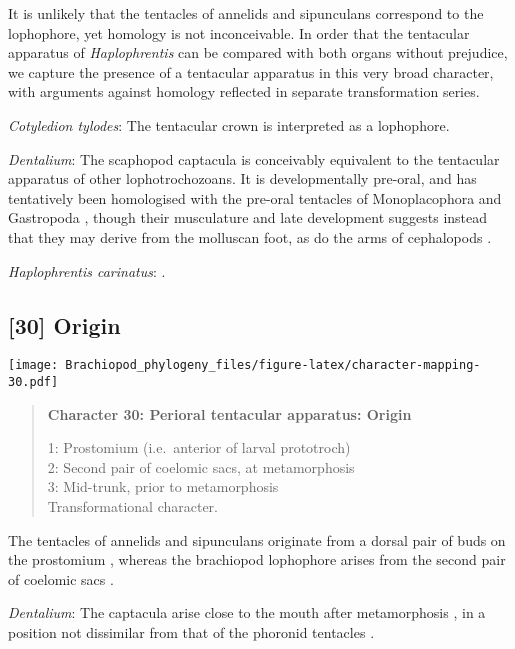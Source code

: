 \documentclass[openany]{book}
\theoremstyle{definition}
\theoremstyle{definition}
\theoremstyle{definition}
\theoremstyle{remark}
\begin{document}
It is unlikely that the tentacles of annelids and sipunculans correspond
to the lophophore, yet homology is not inconceivable. In order that the
tentacular apparatus of \emph{Haplophrentis} can be compared with both
organs without prejudice, we capture the presence of a tentacular
apparatus in this very broad character, with arguments against homology
reflected in separate transformation series.

\hypertarget{Cotyledion_tylodes-coding-29}{}
\emph{Cotyledion tylodes}: The tentacular crown \citep{Zhang2013} is
interpreted as a lophophore.

\hypertarget{Dentalium-coding-29}{}
\emph{Dentalium}: The scaphopod captacula is conceivably equivalent to
the tentacular apparatus of other lophotrochozoans. It is
developmentally pre-oral, and has tentatively been homologised with the
pre-oral tentacles of Monoplacophora and Gastropoda \citep{Steiner1992},
though their musculature and late development suggests instead that they
may derive from the molluscan foot, as do the arms of cephalopods
\citep{Wanninger2002M}.

\hypertarget{Haplophrentis_carinatus-coding-29}{}
\emph{Haplophrentis carinatus}: \citet{Moysiuk2017Hyolithsare}.

\subsection*{{[}30{]} Origin}\label{origin}

\texttt{[image: Brachiopod\_phylogeny\_files/figure-latex/character-mapping-30.pdf]}

\begin{quote}
\textbf{Character 30: Perioral tentacular apparatus: Origin}

1: Prostomium (i.e.~anterior of larval prototroch)\\
2: Second pair of coelomic sacs, at metamorphosis\\
3: Mid-trunk, prior to metamorphosis\\
Transformational character.
\end{quote}

The tentacles of annelids and sipunculans originate from a dorsal pair
of buds on the prostomium \citep{Adrianov2006}, whereas the brachiopod
lophophore arises from the second pair of coelomic sacs
\citep{Nielsen1991}.

\hypertarget{Dentalium-coding-30}{}
\emph{Dentalium}: The captacula arise close to the mouth after
metamorphosis \citep{Wanninger2002M}, in a position not dissimilar from
that of the phoronid tentacles \citep{Santagata2004}.
\end{document}
